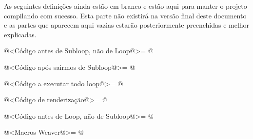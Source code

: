 
As seguintes definições ainda estão em branco e estão aqui para manter
o projeto compilando com sucesso. Esta parte não existirá na versão
final deste documento e as partes que aparecem aqui vazias estarão
posteriormente preenchidas e melhor explicadas.

\iniciocodigo
@<Código antes de Subloop, não de Loop@>=
@
\fimcodigo

\iniciocodigo
@<Código após sairmos de Subloop@>=
@
\fimcodigo

\iniciocodigo
@<Código a executar todo loop@>=
@
\fimcodigo

\iniciocodigo
@<Código de renderização@>=
@
\fimcodigo

\iniciocodigo
@<Código antes de Loop, não de Subloop@>=
@
\fimcodigo

\iniciocodigo
@<Macros Weaver@>=
@
\fimcodigo





\fim
